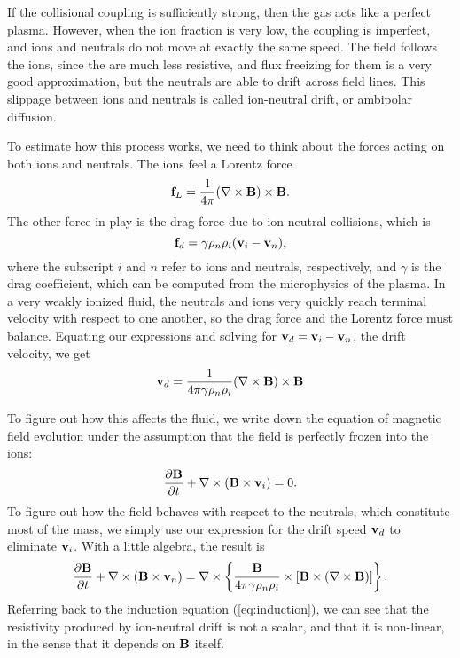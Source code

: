 If the collisional coupling is sufficiently strong, then the gas acts like a perfect plasma. However, when the ion fraction is very low, the coupling is imperfect, and ions and neutrals do not move at exactly the same speed. The field follows the ions, since the are much less resistive, and flux freeizing for them is a very good approximation, but the neutrals are able to drift across field lines. This slippage between ions and neutrals is called ion-neutral drift, or ambipolar diffusion.

To estimate how this process works, we need to think about the forces acting on both ions and neutrals. The ions feel a Lorentz force
\begin{equation}
\mathbf{f}_L = \frac{1}{4\pi} (\nabla \times \mathbf{B}) \times \mathbf{B}.
\end{equation}
The other force in play is the drag force due to ion-neutral collisions, which is
\begin{equation}
\mathbf{f}_d = \gamma\rho_n \rho_i (\mathbf{v}_i-\mathbf{v}_n),
\end{equation}
where the subscript $i$ and $n$ refer to ions and neutrals, respectively, and $\gamma$ is the drag coefficient, which can be computed from the microphysics of the plasma. In a very weakly ionized fluid, the neutrals and ions very quickly reach terminal velocity with respect to one another, so the drag force and the Lorentz force must balance. Equating our expressions and solving for $\mathbf{v}_d=\mathbf{v}_i-\mathbf{v}_n$, the drift velocity, we get
\begin{equation}
\mathbf{v}_d  = \frac{1}{4\pi\gamma\rho_n\rho_i}(\nabla\times\mathbf{B})\times\mathbf{B}
\end{equation}

To figure out how this affects the fluid, we write down the equation of magnetic field evolution under the assumption that the field is perfectly frozen into the ions:
\begin{equation}
\frac{\partial \mathbf{B}}{\partial t} + \nabla\times(\mathbf{B}\times \mathbf{v}_i) = 0.
\end{equation}
To figure out how the field behaves with respect to the neutrals, which constitute most of the mass, we simply use our expression for the drift speed $\mathbf{v}_d$ to eliminate $\mathbf{v}_i$. With a little algebra, the result is
\begin{equation}
\frac{\partial \mathbf{B}}{\partial t} + \nabla\times(\mathbf{B}\times \mathbf{v}_n) = 
\nabla \times \left\{ \frac{\mathbf{B}}{4\pi\gamma\rho_n\rho_i}\times\left[\mathbf{B}\times(\nabla\times\mathbf{B})\right]\right\}.
\end{equation}
Referring back to the induction equation (\ref{eq:induction}), we can see that the resistivity produced by ion-neutral drift is not a scalar, and that it is non-linear, in the sense that it depends on $\mathbf{B}$ itself.

